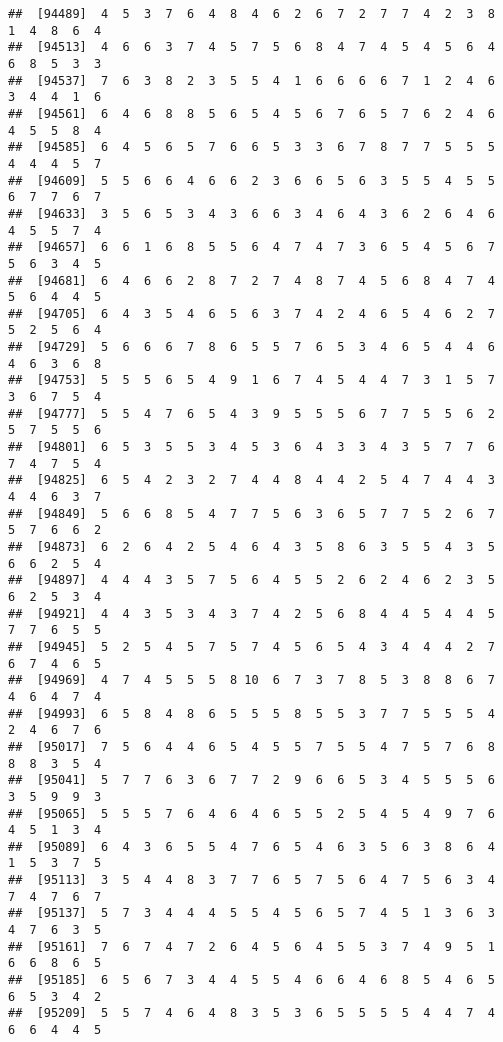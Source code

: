 \documentclass[
]{book}
\begin{document}
\begin{verbatim}
##  [94489]  4  5  3  7  6  4  8  4  6  2  6  7  2  7  7  4  2  3  8  1  4  8  6  4
##  [94513]  4  6  6  3  7  4  5  7  5  6  8  4  7  4  5  4  5  6  4  6  8  5  3  3
##  [94537]  7  6  3  8  2  3  5  5  4  1  6  6  6  6  7  1  2  4  6  3  4  4  1  6
##  [94561]  6  4  6  8  8  5  6  5  4  5  6  7  6  5  7  6  2  4  6  4  5  5  8  4
##  [94585]  6  4  5  6  5  7  6  6  5  3  3  6  7  8  7  7  5  5  5  4  4  4  5  7
##  [94609]  5  5  6  6  4  6  6  2  3  6  6  5  6  3  5  5  4  5  5  6  7  7  6  7
##  [94633]  3  5  6  5  3  4  3  6  6  3  4  6  4  3  6  2  6  4  6  4  5  5  7  4
##  [94657]  6  6  1  6  8  5  5  6  4  7  4  7  3  6  5  4  5  6  7  5  6  3  4  5
##  [94681]  6  4  6  6  2  8  7  2  7  4  8  7  4  5  6  8  4  7  4  5  6  4  4  5
##  [94705]  6  4  3  5  4  6  5  6  3  7  4  2  4  6  5  4  6  2  7  5  2  5  6  4
##  [94729]  5  6  6  6  7  8  6  5  5  7  6  5  3  4  6  5  4  4  6  4  6  3  6  8
##  [94753]  5  5  5  6  5  4  9  1  6  7  4  5  4  4  7  3  1  5  7  3  6  7  5  4
##  [94777]  5  5  4  7  6  5  4  3  9  5  5  5  6  7  7  5  5  6  2  5  7  5  5  6
##  [94801]  6  5  3  5  5  3  4  5  3  6  4  3  3  4  3  5  7  7  6  7  4  7  5  4
##  [94825]  6  5  4  2  3  2  7  4  4  8  4  4  2  5  4  7  4  4  3  4  4  6  3  7
##  [94849]  5  6  6  8  5  4  7  7  5  6  3  6  5  7  7  5  2  6  7  5  7  6  6  2
##  [94873]  6  2  6  4  2  5  4  6  4  3  5  8  6  3  5  5  4  3  5  6  6  2  5  4
##  [94897]  4  4  4  3  5  7  5  6  4  5  5  2  6  2  4  6  2  3  5  6  2  5  3  4
##  [94921]  4  4  3  5  3  4  3  7  4  2  5  6  8  4  4  5  4  4  5  7  7  6  5  5
##  [94945]  5  2  5  4  5  7  5  7  4  5  6  5  4  3  4  4  4  2  7  6  7  4  6  5
##  [94969]  4  7  4  5  5  5  8 10  6  7  3  7  8  5  3  8  8  6  7  4  6  4  7  4
##  [94993]  6  5  8  4  8  6  5  5  5  8  5  5  3  7  7  5  5  5  4  2  4  6  7  6
##  [95017]  7  5  6  4  4  6  5  4  5  5  7  5  5  4  7  5  7  6  8  8  8  3  5  4
##  [95041]  5  7  7  6  3  6  7  7  2  9  6  6  5  3  4  5  5  5  6  3  5  9  9  3
##  [95065]  5  5  5  7  6  4  6  4  6  5  5  2  5  4  5  4  9  7  6  4  5  1  3  4
##  [95089]  6  4  3  6  5  5  4  7  6  5  4  6  3  5  6  3  8  6  4  1  5  3  7  5
##  [95113]  3  5  4  4  8  3  7  7  6  5  7  5  6  4  7  5  6  3  4  7  4  7  6  7
##  [95137]  5  7  3  4  4  4  5  5  4  5  6  5  7  4  5  1  3  6  3  4  7  6  3  5
##  [95161]  7  6  7  4  7  2  6  4  5  6  4  5  5  3  7  4  9  5  1  6  6  8  6  5
##  [95185]  6  5  6  7  3  4  4  5  5  4  6  6  4  6  8  5  4  6  5  6  5  3  4  2
##  [95209]  5  5  7  4  6  4  8  3  5  3  6  5  5  5  5  4  4  7  4  6  6  4  4  5

\end{verbatim}
\end{document}
